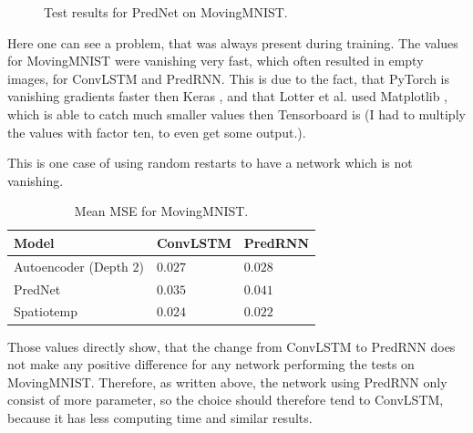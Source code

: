    \begin{figure}[H]
   \centering
   \qquad
   \qquad
   \caption{Test results for PredNet on MovingMNIST.}
   \label{figure::prednet_mnist_results}
  \end{figure}\noindent
  Here one can see a problem, that was always present during training. The values for MovingMNIST were vanishing very fast, which often resulted in empty images,
  for ConvLSTM and PredRNN. This is due to the fact, that PyTorch is vanishing gradients faster then Keras \cite{chollet2015}, and that Lotter et al. used 
  Matplotlib \cite{Hunter2007}, which is able to catch much smaller values then Tensorboard is (I had to multiply the values with factor ten, to even get some
  output.).
    
  This is one case of using random restarts to have a network which is not vanishing.
   \begin{table}[H]
    \begin{center}
     \begin{tabular}{| l | l | l |}\hline
      \textbf{Model} & \textbf{ConvLSTM} & \textbf{PredRNN} \\\hline
      Autoencoder (Depth $2$) & $0.027$ & $0.028$ \\\hline
      PredNet & $0.035$ & $0.041$ \\\hline
      Spatiotemp & $0.024$ & $0.022$ \\\hline
     \end{tabular}
    \end{center}
    \caption{Mean MSE for MovingMNIST.}
   \end{table}\noindent
   Those values directly show, that the change from ConvLSTM to PredRNN does not make any positive difference for any network performing the tests on MovingMNIST.
   Therefore, as written above, the network using PredRNN only consist of more parameter, so the choice should therefore tend to ConvLSTM, because it has less
   computing time and similar results.
   
